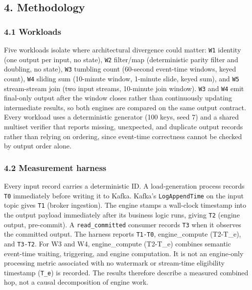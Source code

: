 \documentclass[
]{article}
\begin{document}
\hypertarget{methodology}{%
\subsection{4. Methodology}\label{methodology}}

\hypertarget{workloads}{%
\subsubsection{4.1 Workloads}\label{workloads}}

Five workloads isolate where architectural divergence could matter:
\texttt{W1} identity (one output per input, no state), \texttt{W2}
filter/map (deterministic parity filter and doubling, no state),
\texttt{W3} tumbling count (60-second event-time windows, keyed count),
\texttt{W4} sliding sum (10-minute window, 1-minute slide, keyed sum),
and \texttt{W5} stream-stream join (two input streams, 10-minute join
window). \texttt{W3} and \texttt{W4} emit final-only output after the
window closes rather than continuously updating intermediate results, so
both engines are compared on the same output contract. Every workload
uses a deterministic generator (100 keys, seed 7) and a shared multiset
verifier that reports missing, unexpected, and duplicate output records
rather than relying on ordering, since event-time correctness cannot be
checked by output order alone.

\hypertarget{measurement-harness}{%
\subsubsection{4.2 Measurement harness}\label{measurement-harness}}

Every input record carries a deterministic ID. A load-generation process
records \texttt{T0} immediately before writing it to Kafka. Kafka's
\texttt{LogAppendTime} on the input topic gives \texttt{T1} (broker
ingestion). The engine stamps a wall-clock timestamp into the output
payload immediately after its business logic runs, giving \texttt{T2}
(engine output, pre-commit). A \texttt{read\_committed} consumer records
\texttt{T3} when it observes the committed output. The harness reports
\texttt{T1-T0}, engine_compute (T2-T_e), and \texttt{T3-T2}. For W3 and W4,
engine_compute (T2-T_e) combines semantic event-time waiting, triggering, and
engine computation. It is not an engine-only processing metric associated with
no watermark or stream-time eligibility timestamp (\texttt{T\_e}) is
recorded. The results therefore describe a measured combined hop, not a
causal decomposition of engine work.
\end{document}

